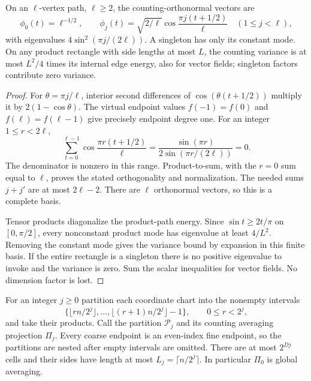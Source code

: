 \begin{lemma}\label{lem:neumann}
On an $\ell$-vertex path, $\ell\geq2$, the counting-orthonormal vectors are
\[
 \phi_0(t)=\ell^{-1/2},\qquad
 \phi_j(t)=\sqrt{2/\ell}\cos\frac{\pi j(t+1/2)}\ell
 \quad(1\leq j<\ell),
\]
with eigenvalues $4\sin^2(\pi j/(2\ell))$. A singleton has only its constant
mode. On any product rectangle with side lengths at most $L$, the counting
variance is at most $L^2/4$ times its internal edge energy, also for vector
fields; singleton factors contribute zero variance.
\end{lemma}
\begin{proof}
For $\theta=\pi j/\ell$, interior second differences of
$\cos(\theta(t+1/2))$ multiply it by $2(1-\cos\theta)$. The virtual endpoint
values $f(-1)=f(0)$ and $f(\ell)=f(\ell-1)$ give precisely endpoint degree
one. For an integer $1\leq r<2\ell$,
\[
 \sum_{t=0}^{\ell-1}\cos\frac{\pi r(t+1/2)}\ell
 =\frac{\sin(\pi r)}{2\sin(\pi r/(2\ell))}=0.
\]
The denominator is nonzero in this range. Product-to-sum, with the $r=0$
sum equal to $\ell$, proves the stated orthogonality and normalization.
The needed sums $j+j'$ are at most $2\ell-2$. There are $\ell$ orthonormal
vectors, so this is a complete basis.

Tensor products diagonalize the product-path energy. Since
$\sin t\geq2t/\pi$ on $[0,\pi/2]$, every nonconstant product mode has
eigenvalue at least $4/L^2$. Removing the constant mode gives the variance
bound by expansion in this finite basis. If the entire rectangle is a
singleton there is no positive eigenvalue to invoke and the variance is zero.
Sum the scalar inequalities for vector fields. No dimension factor is lost.
\end{proof}

For an integer $j\geq0$ partition each coordinate chart into the nonempty
intervals
\[
 \{\lfloor rn/2^j\rfloor,\ldots,\lfloor(r+1)n/2^j\rfloor-1\},
 \qquad0\leq r<2^j,
\]
and take their products. Call the partition $\mathcal P_j$ and its counting
averaging projection $\Pi_j$. Every coarse endpoint is an even-index fine
endpoint, so the partitions are nested after empty intervals are omitted.
There are at most $2^{Dj}$ cells and their sides have length at most
$L_j=\lceil n/2^j\rceil$. In particular $\Pi_0$ is global averaging.

